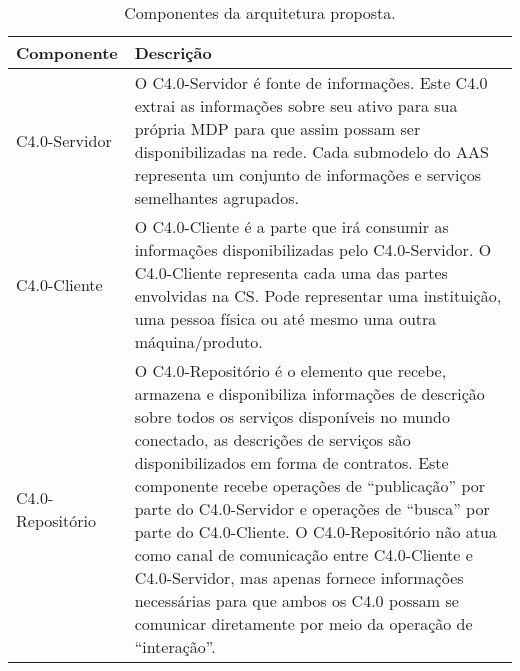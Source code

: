 \begin{table}[t]
	\centering
	\caption{Componentes da arquitetura proposta.}
	\label{tab:componentes-ws}
	\begin{tabular}{p{3cm}p{12cm}}
		\hline
		\textbf{Componente}
		 & \textbf{Descrição}                                                                                                                                                                                                                                                                                                                                                                                                                                                                                                                                                                               \\

		\hline
		C4.0-Servidor
		 & O C4.0-Servidor é fonte de informações. Este C4.0 extrai as informações sobre seu ativo para sua própria MDP para que assim possam ser disponibilizadas na rede. Cada submodelo do AAS representa um conjunto de informações e serviços semelhantes agrupados.                                                                                                                                                                                                                                                                                                                                   \\

		\hline
		C4.0-Cliente
		 & O C4.0-Cliente é a parte que irá consumir as informações disponibilizadas pelo C4.0-Servidor. O C4.0-Cliente representa cada uma das partes envolvidas na CS. Pode representar uma instituição, uma pessoa física ou até mesmo uma outra máquina/produto.                                                                                                                                                                                                                                                                                                                                        \\

		\hline
		C4.0-Repositório
		 & O C4.0-Repositório é o elemento que recebe, armazena e disponibiliza informações de descrição sobre todos os serviços disponíveis no mundo conectado, as descrições de serviços são disponibilizados em forma de contratos. Este componente recebe operações de ``publicação'' por parte do C4.0-Servidor e operações de ``busca'' por parte do C4.0-Cliente. O C4.0-Repositório não atua como canal de comunicação entre C4.0-Cliente e C4.0-Servidor, mas apenas fornece informações necessárias para que ambos os C4.0 possam se comunicar diretamente por meio da operação de ``interação''. \\

		\hline
	\end{tabular}
\end{table}

